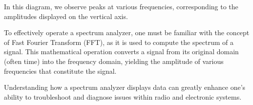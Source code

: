 In this diagram, we observe peaks at various frequencies, corresponding to the amplitudes displayed on the vertical axis. 

To effectively operate a spectrum analyzer, one must be familiar with the concept of Fast Fourier Transform (FFT), as it is used to compute the spectrum of a signal. This mathematical operation converts a signal from its original domain (often time) into the frequency domain, yielding the amplitude of various frequencies that constitute the signal.

Understanding how a spectrum analyzer displays data can greatly enhance one's ability to troubleshoot and diagnose issues within radio and electronic systems.
